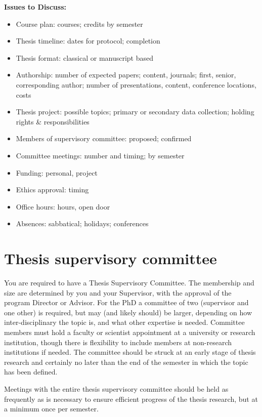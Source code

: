 \documentclass[
  openany]{book}
\providecommand{\tightlist}{%
  \setlength{\itemsep}{0pt}\setlength{\parskip}{0pt}}
\begin{document}
\textbf{Issues to Discuss:}

\begin{itemize}
\tightlist
\item
  Course plan: courses; credits by semester\\
\item
  Thesis timeline: dates for protocol; completion
\item
  Thesis format: classical or manuscript based
\item
  Authorship: number of expected papers; content, journals; first, senior, corresponding author; number of presentations, content, conference locations, costs
\item
  Thesis project: possible topics; primary or secondary data collection; holding rights \& responsibilities
\item
  Members of supervisory committee: proposed; confirmed
\item
  Committee meetings: number and timing; by semester
\item
  Funding: personal, project
\item
  Ethics approval: timing
\item
  Office hours: hours, open door
\item
  Absences: sabbatical; holidays; conferences
\end{itemize}

\hypertarget{thesis-supervisory-committee}{%
\section{Thesis supervisory committee}\label{thesis-supervisory-committee}}

You are required to have a Thesis Supervisory Committee. The membership and size are determined by you and your Supervisor, with the approval of the program Director or Advisor. For the PhD a committee of two (supervisor and one other) is required, but may (and likely should) be larger, depending on how inter-disciplinary the topic is, and what other expertise is needed. Committee members must hold a faculty or scientist appointment at a university or research institution, though there is flexibility to include members at non-research institutions if needed. The committee should be struck at an early stage of thesis research and certainly no later than the end of the semester in which the topic has been defined.

Meetings with the entire thesis supervisory committee should be held as frequently as is necessary to ensure efficient progress of the thesis research, but at a minimum once per semester.
\end{document}
